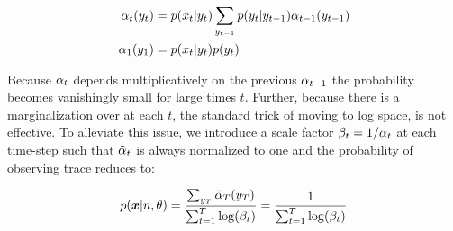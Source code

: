 \begin{align*}
  \alpha_{t}(y_{t}) &= p(x_{t}|y_{t}) \sum_{y_{t-1}} p(y_{t} | y_{t-1}) \alpha_{t-1}(y_{t-1})\\
  \alpha_{1}(y_{1}) &= p(x_{t}|y_{t}) p(y_{t})
\end{align*}

Because $\alpha_{t}$ depends multiplicatively on the previous $\alpha_{t-1}$ the probability becomes vanishingly small for large times $t$. Further, because there is a marginalization over \states at each $t$, the standard trick of moving to log space, is not effective. To alleviate this issue, we introduce a scale factor $\beta_{t} = 1 / \alpha_{t}$ at each time-step such that $\tilde{\alpha}_{t}$ is always normalized to one and the probability of observing trace \trace reduces to:

\begin{equation}
	p(\bm{x} | n, \theta)
    = \frac
      {\sum_{y_{T}}\tilde{\alpha}_{T}(y_{T})}
      {\sum_{t=1}^{T} \log(\beta_{t})}
    = \frac
      {1}
      {\sum_{t=1}^{T} \log(\beta_{t})}
\end{equation}
